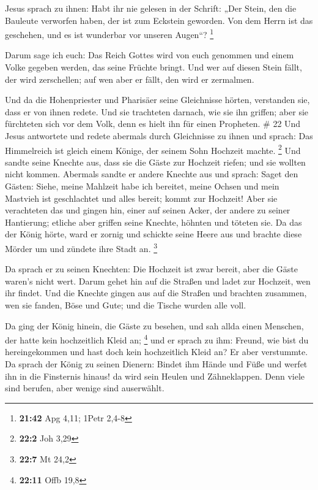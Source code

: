  Jesus sprach zu ihnen: Habt ihr nie gelesen in der
Schrift: „Der Stein, den die Bauleute verworfen haben, der ist zum
Eckstein geworden. Von dem Herrn ist das geschehen, und es ist wunderbar
vor unseren Augen``? \footnote{\textbf{21:42} Apg 4,11; 1Petr 2,4-8}

 Darum sage ich euch: Das Reich Gottes wird von euch
genommen und einem Volke gegeben werden, das seine Früchte bringt.
 Und wer auf diesen Stein fällt, der wird zerschellen; auf
wen aber er fällt, den wird er zermalmen.

 Und da die Hohenpriester und Pharisäer seine Gleichnisse
hörten, verstanden sie, dass er von ihnen redete.  Und sie
trachteten darnach, wie sie ihn griffen; aber sie fürchteten sich vor
dem Volk, denn es hielt ihn für einen Propheten. \# 22  Und
Jesus antwortete und redete abermals durch Gleichnisse zu ihnen und
sprach:  Das Himmelreich ist gleich einem Könige, der seinem
Sohn Hochzeit machte. \footnote{\textbf{22:2} Joh 3,29}  Und
sandte seine Knechte aus, dass sie die Gäste zur Hochzeit riefen; und
sie wollten nicht kommen.  Abermals sandte er andere Knechte
aus und sprach: Saget den Gästen: Siehe, meine Mahlzeit habe ich
bereitet, meine Ochsen und mein Mastvieh ist geschlachtet und alles
bereit; kommt zur Hochzeit!  Aber sie verachteten das und
gingen hin, einer auf seinen Acker, der andere zu seiner Hantierung;
 etliche aber griffen seine Knechte, höhnten und töteten
sie.  Da das der König hörte, ward er zornig und schickte
seine Heere aus und brachte diese Mörder um und zündete ihre Stadt an.
\footnote{\textbf{22:7} Mt 24,2}

 Da sprach er zu seinen Knechten: Die Hochzeit ist zwar
bereit, aber die Gäste waren's nicht wert.  Darum gehet hin
auf die Straßen und ladet zur Hochzeit, wen ihr findet. 
Und die Knechte gingen aus auf die Straßen und brachten zusammen, wen
sie fanden, Böse und Gute; und die Tische wurden alle voll.

 Da ging der König hinein, die Gäste zu besehen, und sah
allda einen Menschen, der hatte kein hochzeitlich Kleid an; \footnote{\textbf{22:11}
  Offb 19,8}  und er sprach zu ihm: Freund, wie bist du
hereingekommen und hast doch kein hochzeitlich Kleid an? Er aber
verstummte.  Da sprach der König zu seinen Dienern: Bindet
ihm Hände und Füße und werfet ihn in die Finsternis hinaus! da wird sein
Heulen und Zähneklappen.  Denn viele sind berufen, aber
wenige sind auserwählt.

